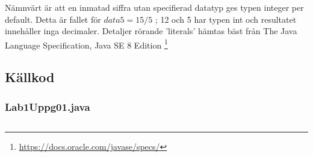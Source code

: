 
\par Nämnvärt är att en inmatad siffra utan specifierad datatyp ges typen
integer
per default. Detta är fallet för $data5 = 15 / 5$ ; 12 och 5 har typen int och
resultatet innehåller inga decimaler.  Detaljer rörande 'literals' hämtas bäst
från The Java Language Specification, Java SE 8 Edition
\footnote{\url{https://docs.oracle.com/javase/specs/}}



\subsection{Källkod}\label{subsection-1}
\subsubsection*{Lab1Uppg01.java}
\inputminted[]{java}{src/Lab1Uppg01.java}


